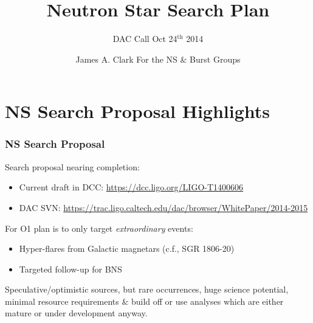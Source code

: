\documentclass{beamer}
\begin{document}
\title{Neutron Star Search Plan}
\subtitle{DAC Call Oct 24$^{\text{th}}$ 2014}  
\author{James A. Clark For the NS \& Burst Groups}
\date{} 

\begin{frame}[plain]
\titlepage
\end{frame}



\section{NS Search Proposal Highlights}

\begin{frame}
    \frametitle{NS Search Proposal}
    Search proposal nearing completion:
    \begin{itemize}
        \item Current draft in DCC: {\small \href{https://dcc.ligo.org/LIGO-T1400606}{https://dcc.ligo.org/LIGO-T1400606}}
        \item DAC SVN:
            {\small \href{https://trac.ligo.caltech.edu/dac/browser/WhitePaper/2014-2015}
            {https://trac.ligo.caltech.edu/dac/browser/WhitePaper/2014-2015}}
    \end{itemize}
    For O1 plan is to only target \emph{extraordinary} events:
    \begin{itemize}
        \item Hyper-flares from Galactic magnetars (c.f., SGR 1806-20)
        \item Targeted follow-up for BNS
    \end{itemize}
    Speculative/optimistic sources, but rare occurrences, huge
    science potential, minimal resource requirements \& build off or use
    analyses which are either mature or under development anyway.
\end{frame}
\end{document}
